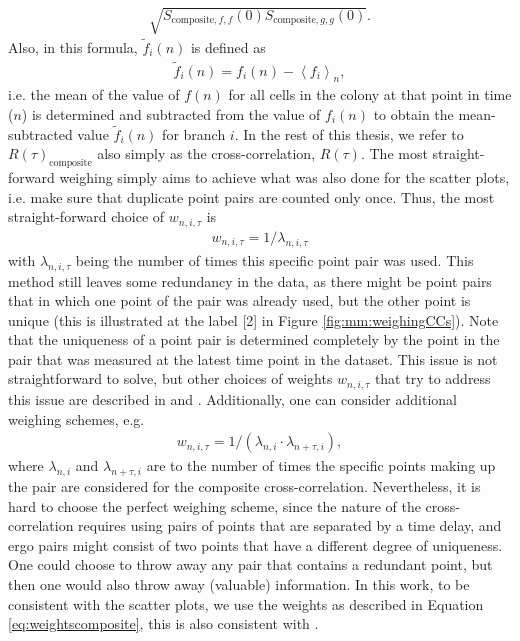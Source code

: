 {\begin{align*}
\sqrt{S_{\text{composite},f,f}(0)S_{\text{composite},g,g}(0)}
.
\end{align*}
% 
Also, in this formula, $\tilde{f}_i(n)$ is defined as 
\begin{align*}
\tilde{f}_i(n) = f_i(n)-\left<f_i\right>_n
, 
\end{align*}
i.e. the mean of the value of $f(n)$ for all cells in the colony at that point in time ($n$) is determined and subtracted from the value of $f_i(n)$ to obtain the mean-subtracted value $\tilde{f}_i(n)$ for branch $i$.
%
In the rest of this thesis, we refer to $R(\tau)_\text{composite}$ also simply as
the cross-correlation, $R(\tau)$.
%
The most straight-forward weighing simply aims to achieve what was also done for the scatter plots, i.e. make sure that duplicate point pairs are counted only once.
%
Thus, the most straight-forward choice of $w_{n,i,\tau}$ is 
\begin{align}
\label{eq:weightscomposite}
w_{n,i,\tau} = 1/\lambda_{n,i,\tau}
\end{align}
with $\lambda_{n,i,\tau}$ being the number of times this specific point pair was used.
This method still leaves some redundancy in the data, as there might be point pairs that in which one point of the pair was already used, but the other point is unique (this is illustrated at the label [2] in Figure \ref{fig:mm:weighingCCs}).
Note that the uniqueness of a point pair is determined completely by the point in the pair that was measured at the latest time point in the dataset.
This issue is not straightforward to solve, but
other choices of weights $w_{n,i,\tau}$ 
that try to address this issue
are described in \cite{Kiviet2010} and \cite{Walker2016t}. 
Additionally, one can consider additional weighing schemes, e.g. 
\begin{align*}
	w_{n,i,\tau} = 1/ \left( \lambda_{n,i} \cdot \lambda_{n+\tau,i} \right),
\end{align*}
where $\lambda_{n,i}$ and $\lambda_{n+\tau,i}$ are to the number of times the specific points making up the pair are considered for the composite cross-correlation.
%
Nevertheless, it is hard to choose the perfect weighing scheme, since the nature of the cross-correlation 
requires using pairs of points that are separated by a time delay, 
and ergo pairs might consist of two points that have a different degree of uniqueness.
One could choose to throw away any pair that contains a redundant point, but then one would also throw away (valuable) information.
%
In this work, to be consistent with the scatter plots, we use the weights as described in Equation \ref{eq:weightscomposite}, this is also consistent with \cite{Dunlop2008}.

}
